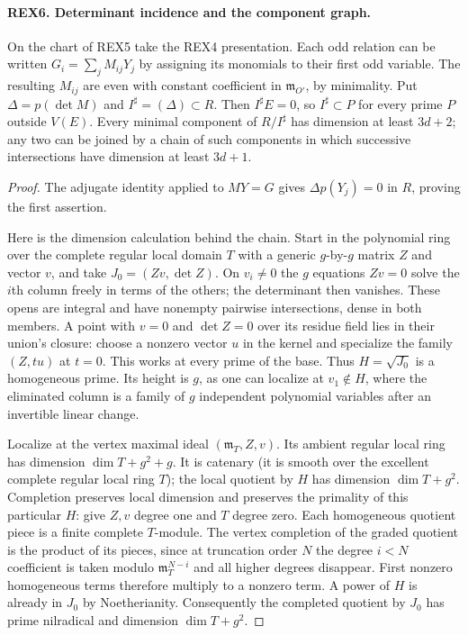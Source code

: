 \paragraph{REX6. Determinant incidence and the component graph.}
\label{claim:REX6}
On the chart of REX5 take the REX4 presentation. Each odd relation
can be written \(G_i=\sum_jM_{ij}Y_j\) by assigning its monomials to
their first odd variable. The resulting \(M_{ij}\) are even with
constant coefficient in \(\mathfrak m_{O'}\), by minimality. Put
\(\Delta=p(\det M)\) and \(I^\sharp=(\Delta)\subset R\). Then
\(I^\sharp E=0\), so \(I^\sharp\subset P\) for every prime
\(P\) outside \(V(E)\). Every minimal component of \(R/I^\sharp\)
has dimension at least \(3d+2\); any two can be joined by a chain
of such components in which successive intersections have dimension
at least \(3d+1\).
\begin{proof}
The adjugate identity applied to \(MY=G\) gives \(\Delta p(Y_j)=0\)
in \(R\), proving the first assertion.

Here is the dimension calculation behind the chain. Start in the
polynomial ring over the complete regular local domain \(T\) with
a generic \(g\)-by-\(g\) matrix \(Z\) and vector \(v\), and take
\(J_0=(Zv,\det Z)\). On \(v_i\ne0\) the \(g\) equations \(Zv=0\)
solve the \(i\)th column freely in terms of the others; the determinant
then vanishes. These opens are integral and have nonempty pairwise
intersections, dense in both members. A point with \(v=0\) and
\(\det Z=0\) over its residue field lies in their union's closure:
choose a nonzero vector \(u\) in the kernel and specialize the family
\((Z,tu)\) at \(t=0\). This works at every prime of the base. Thus
\(H=\sqrt{J_0}\) is a homogeneous prime. Its height is \(g\), as one
can localize at \(v_1\notin H\), where the eliminated column is a
family of \(g\) independent polynomial variables after an invertible
linear change.

Localize at the vertex maximal ideal \((\mathfrak m_T,Z,v)\).
Its ambient regular local ring has dimension \(\dim T+g^2+g\).
It is catenary (it is smooth over the excellent complete regular
local ring \(T\)); the local quotient by \(H\) has dimension
\(\dim T+g^2\). Completion preserves local dimension and preserves
the primality of this particular \(H\): give \(Z,v\) degree one
and \(T\) degree zero. Each homogeneous quotient piece is a finite
complete \(T\)-module. The vertex completion of the graded quotient
is the product of its pieces, since at truncation order \(N\)
the degree \(i<N\) coefficient is taken modulo
\(\mathfrak m_T^{N-i}\) and all higher degrees disappear. First
nonzero homogeneous terms therefore multiply to a nonzero term.
A power of \(H\) is already in \(J_0\) by Noetherianity. Consequently
the completed quotient by \(J_0\) has prime nilradical and dimension
\(\dim T+g^2\).


\end{proof}
